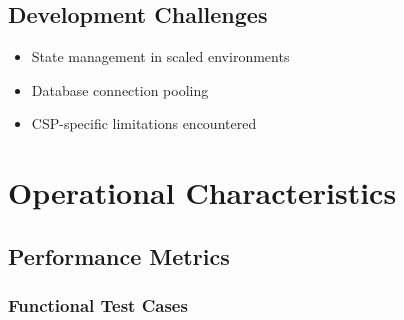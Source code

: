 \documentclass{llncs}
\begin{document}
\subsection{Development Challenges}
\begin{itemize}
    \item State management in scaled environments
    \item Database connection pooling
    \item CSP-specific limitations encountered
\end{itemize}

\section{Operational Characteristics}
\subsection{Performance Metrics}

\subsubsection{Functional Test Cases}
\end{document}
